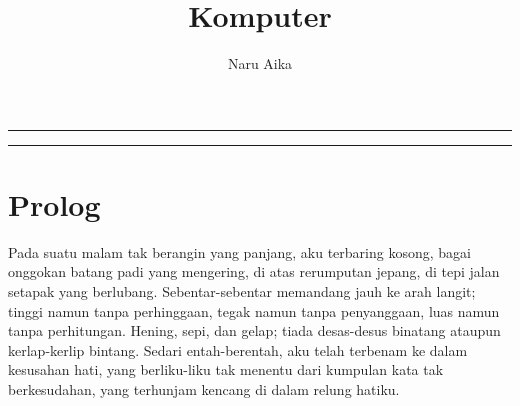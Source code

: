 \documentclass[smalldemyvopaper,11pt,twoside,onecolumn,openright,extrafontsizes]{memoir}
\title{Komputer}
\author{Naru Aika}
\newcommand{\ISBN}{0-000-00000-0}
\newcommand{\press}{}
\newcommand*\halftitlepage{\begingroup %
  \setlength\drop{0.1\textheight}
  \begin{center}
  \vspace*{\drop}
  \rule{\textwidth}{0in}\par
  {\Large\textsc\thetitle\par}
  \rule{\textwidth}{0in}\par
  \vfill
  \end{center}
\endgroup}
\newlength\drop{}
\newcommand*\titleM{\begingroup %
  \setlength\drop{0.15\textheight}
  \begin{center}
  \vspace*{\drop}
  \rule{\textwidth}{0in}\par
  {\HUGE\textsc\thetitle\par}
  \rule{\textwidth}{0in}\par
  {\Large\textit\theauthor\par}
  \vfill
  {\Large\scshape\press}
  \end{center}
\endgroup}
\begin{document}
\pagestyle{empty}
\titleM{}
\clearpage


\frontmatter{}
\pagestyle{mystyle}

\mainmatter{}

\chapter*{Prolog}


Pada suatu malam tak berangin yang panjang, aku terbaring kosong, bagai onggokan batang padi yang mengering, di atas rerumputan jepang, di tepi jalan setapak yang berlubang. Sebentar-sebentar memandang jauh ke arah langit; tinggi namun tanpa perhinggaan, tegak namun tanpa penyanggaan, luas namun tanpa perhitungan. Hening, sepi, dan gelap; tiada desas-desus binatang ataupun kerlap-kerlip bintang. Sedari entah-berentah, aku telah terbenam ke dalam kesusahan hati, yang berliku-liku tak menentu dari kumpulan kata tak berkesudahan, yang terhunjam kencang di dalam relung hatiku.
\end{document}
